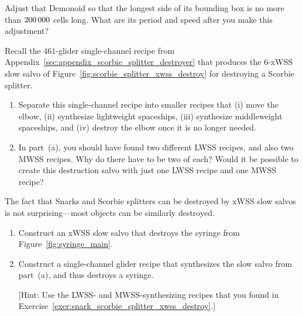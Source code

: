 \begin{multicols}{2}
\begin{problemstar}
		Adjust that Demonoid so that the longest side of its bounding box is no more than $200{\,}000$ cells long. What are its period and speed after you make this adjustment?
	\end{problemstar}


	\mfilbreak
	
	
	\begin{problem}\label{exer:snark_scorbie_splitter_xwss_destroy}
		Recall the $461$-glider single-channel recipe from Appendix~\ref{sec:appendix_scorbie_splitter_destroyer} that produces the $6$-xWSS slow salvo of Figure~\ref{fig:scorbie_splitter_xwss_destroy} for destroying a Scorbie splitter.
		
		\begin{enumerate}[label=\bf\color{ocre}(\alph*)]
			\item Separate this single-channel recipe into smaller recipes that (i) move the elbow, (ii) synthesize lightweight spaceships, (iii) synthesize middleweight spaceships, and (iv) destroy the elbow once it is no longer needed.
			
			\item In part~(a), you should have found two different LWSS recipes, and also two MWSS recipes. Why do there have to be two of each? Would it be possible to create this destruction salvo with just one LWSS recipe and one MWSS recipe?
		\end{enumerate}
	\end{problem}


	\mfilbreak
	
	
	\begin{problem}\label{exer:syringe_xwss_destroy}
		The fact that Snarks and Scorbie splitters can be destroyed by xWSS slow salvos is not surprising---most objects can be similarly destroyed.
				
		\begin{enumerate}[label=\bf\color{ocre}(\alph*)]
			\item Construct an xWSS slow salvo that destroys the syringe from Figure~\ref{fig:syringe_main}.
			
			\item Construct a single-channel glider recipe that synthesizes the slow salvo from part~(a), and thus destroys a syringe.
			
			[Hint: Use the LWSS- and MWSS-synthesizing recipes that you found in Exercise~\ref{exer:snark_scorbie_splitter_xwss_destroy}.]
		\end{enumerate}
	\end{problem}



\end{multicols}
